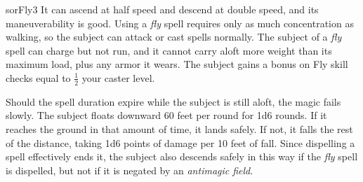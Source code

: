 \begin{spellcard}{sor}{Fly}{3}
  It can ascend at half speed and descend at double speed, and its maneuverability is good.
  Using a \emph{fly} spell requires only as much concentration as walking,
  so the subject can attack or cast spells normally.
  The subject of a \emph{fly} spell can charge but not run,
  and it cannot carry aloft more weight than its maximum load, plus any armor it wears.
  The subject gains a bonus on Fly skill checks equal to \(\frac{1}{2}\) your caster level.

  Should the spell duration expire while the subject is still aloft, the magic fails slowly.
  The subject floats downward 60 feet per round for 1d6 rounds.
  If it reaches the ground in that amount of time, it lands safely.
  If not, it falls the rest of the distance, taking 1d6 points of damage per 10 feet of fall.
  Since dispelling a spell effectively ends it,
  the subject also descends safely in this way if the \emph{fly} spell is dispelled,
  but not if it is negated by an \emph{antimagic field}.

\end{spellcard}

